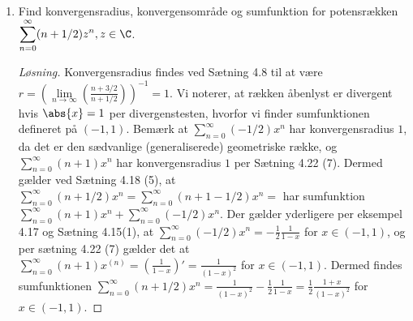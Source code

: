 \setcounter{section}{3}

\begin{opg}\hfill \\
	\begin{enumerate}
		\item Find konvergensradius, konvergensomr\aa{}de  og sumfunktion for potensr\ae{}kken $\displaystyle \sum_{n=0}^{\infty}(n+1/2)z^n ,  z\in\C $. %
			\ifanswers
			\begin{proof}[Løsning]
				Konvergensradius findes ved Sætning 4.8 til at være $ r=\left(\lim\limits_{n\to\infty}\left(\frac{n+3/2}{n+1/2}\right)\right)^{-1}=1 $. Vi noterer, at rækken åbenlyst er divergent hvis $ \abs{x}=1 $ per divergenstesten, hvorfor vi finder sumfunktionen defineret på $ (-1,1) $. Bemærk at $ \sum_{n=0}^{\infty}(-1/2)x^n $ har konvergensradius $ 1 $, da det er den sædvanlige (generaliserede) geometriske række, og $ \sum_{n=0}^{\infty}(n+1)x^n $ har konvergensradius $ 1 $ per Sætning 4.22 (7). Dermed gælder ved Sætning 4.18 (5), at $ \sum_{n=0}^{\infty}(n+1/2)x^n=\sum_{n=0}^{\infty}(n+1-1/2)x^n= $ har sumfunktion $ \sum_{n=0}^{\infty}(n+1)x^n+\sum_{n=0}^{\infty}(-1/2)x^n  $. Der gælder yderligere per eksempel 4.17 og Sætning 4.15(1), at $ \sum_{n=0}^{\infty}(-1/2)x^n=-\frac{1}{2}\frac{1}{1-x} $ for $x\in (-1,1) $, og per sætning 4.22 (7) gælder det at $ \sum_{n=0}^{\infty}(n+1)x^{(n)}=\left(\frac{1}{1-x}\right)'=\frac{1}{(1-x)^2} $ for $ x\in(-1,1) $. Dermed findes sumfunktionen $ \sum_{n=0}^{\infty}(n+1/2)x^n =\frac{1}{(1-x)^2}-\frac{1}{2}\frac{1}{1-x}=\frac{1}{2}\frac{1+x}{(1-x)^2} $ for $ x\in(-1,1) $.	
				\end{proof}
			\fi


\end{enumerate}
\end{opg}
